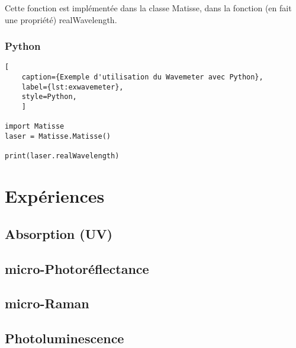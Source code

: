 \documentclass[11pt,francais]{book} %
\begin{document}
Cette fonction est implémentée dans la classe Matisse, dans la fonction (en fait une propriété) realWavelength.

\subsection{Python}

\begin{lstlisting}[
    caption={Exemple d'utilisation du Wavemeter avec Python},
    label={lst:exwavemeter},
    style=Python,
    ]  

import Matisse
laser = Matisse.Matisse()

print(laser.realWavelength)
\end{lstlisting}




\chapter{Expériences}

\section{Absorption (UV)}

\section{micro-Photoréflectance}

\section{micro-Raman}

\section{Photoluminescence}

\end{document}
